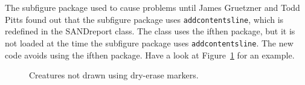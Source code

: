     The subfigure package used to cause problems until James
    Gruetzner and Todd Pitts found out that the subfigure package
    uses {\tt addcontentsline}, which is redefined in the SANDreport
    class. The class uses the ifthen package, but it is not loaded
    at the time the subfigure package uses {\tt addcontentsline}.
    The new code avoids using the ifthen package.  Have a look at
    Figure~\ref{fig:creatures} for an example.

    \begin{figure}[!hbtp]
	\centering
	\caption{Creatures not drawn using dry-erase markers.}
	\label{fig:creatures}
    \end{figure}
